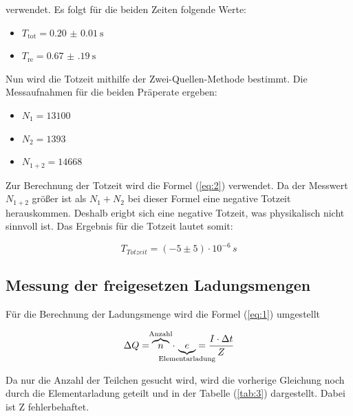 verwendet. Es folgt für die beiden Zeiten folgende Werte:

\begin{itemize}
  \item $T_\text{tot} = \SI{0.20(1)}{\second}$
  \item $T_\text{re} = \SI{0.67(19)}{\second}$
\end{itemize}

Nun wird die Totzeit mithilfe der Zwei-Quellen-Methode bestimmt.
Die Messaufnahmen für die beiden Präperate ergeben:

\begin{itemize}
  \item $N_1 = 13100$
  \item $N_2 = 1393$
  \item $N_{1+2} = 14668$
\end{itemize}

Zur Berechnung der Totzeit wird die Formel (\ref{eq:2}) verwendet.
Da der Messwert $N_{1+2}$ größer ist als $N_1 + N_2$ bei dieser Formel eine
negative Totzeit herauskommen. Deshalb erigbt sich eine negative Totzeit, was
physikalisch nicht sinnvoll ist.
Das Ergebnis  für die Totzeit lautet somit:

\begin{equation*}
  T_{Totzeit} = (-5 \pm 5) \cdot 10^{-6} \, s
\end{equation*}


\subsection{Messung der freigesetzen Ladungsmengen}

Für die Berechnung der Ladungsmenge wird die Formel (\ref{eq:1}) umgestellt

\begin{equation*}
  \Delta Q =\overbrace{n}^{\mathclap{\text{Anzahl}}} \, \cdot \, \underbrace{e}_{\mathclap{\text{Elementarladung}}}  =  \frac{I \cdot \Delta t}{Z}
\end{equation*}

Da nur die Anzahl der Teilchen gesucht wird, wird die vorherige Gleichung noch durch die Elementarladung geteilt und in der Tabelle (\ref{tab:3})
dargestellt. Dabei ist Z fehlerbehaftet.

